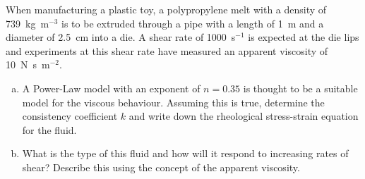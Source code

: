\documentclass[calculator,datasheet,handbook]{exam}
\begin{document}
\begin{question}
  When manufacturing a plastic toy, a polypropylene melt with a
  density of 739~kg~m${}^{-3}$ is to be extruded through a pipe with a
  length of 1~m and a diameter of 2.5~cm into a die. A shear rate of
  1000~s${}^{-1}$ is expected at the die lips and experiments at this
  shear rate have measured an apparent viscosity of 10~N~s~m${}^{-2}$.
  \begin{enumerate}[a)]
  \item A Power-Law model with an exponent of $n=0.35$ is thought to
    be a suitable model for the viscous behaviour. Assuming this is
    true, determine the consistency coefficient $k$ and write down the
    rheological stress-strain equation for the fluid.%
  \item What is the type of this fluid and how will it respond to
    increasing rates of shear? Describe this using the concept of
    the apparent viscosity.%
     
\end{enumerate}
\end{question}
\end{document}

